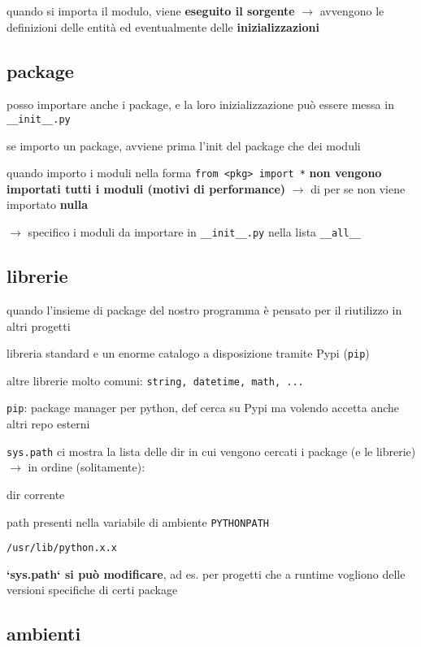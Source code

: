 quando si importa il modulo, viene \textbf{eseguito il sorgente} $\rightarrow$ avvengono le definizioni delle entit\`a ed eventualmente delle \textbf{inizializzazioni}

\subsection{package}

posso importare anche i package, e la loro inizializzazione pu\`o essere messa in \texttt{__init__.py}

se importo un package, avviene prima l'init del package che dei moduli

quando importo i moduli nella forma \texttt{from <pkg> import *} \textbf{non vengono importati tutti i moduli (motivi di performance)} $\rightarrow$ di per se non viene importato \textbf{nulla}

$\rightarrow$ specifico i moduli da importare in \texttt{__init__.py} nella lista \texttt{__all__}

\subsection{librerie}

quando l'insieme di package del nostro programma \`e pensato per il riutilizzo in altri progetti

libreria standard e un enorme catalogo a disposizione tramite Pypi (\texttt{pip})

altre librerie molto comuni: \texttt{string, datetime, math, ...}

\texttt{pip}: package manager per python, def cerca su Pypi ma volendo accetta anche altri repo esterni

\texttt{sys.path} ci mostra la lista delle dir in cui vengono cercati i package (e le librerie) $\rightarrow$ in ordine (solitamente):

dir corrente

path presenti nella variabile di ambiente \texttt{PYTHONPATH}

\texttt{/usr/lib/python.x.x}

\textbf{`sys.path` si pu\`o modificare}, ad es. per progetti che a runtime vogliono delle versioni specifiche di certi package

\subsection{ambienti}

